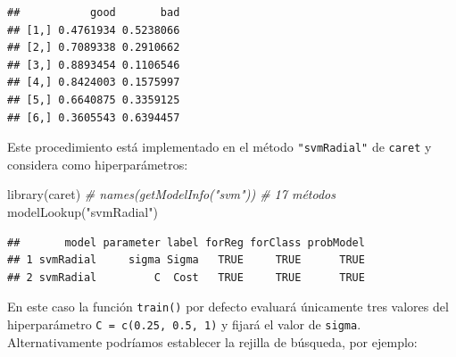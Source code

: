 \documentclass[
]{book}
\newenvironment{Shaded}{\begin{snugshade}}{\end{snugshade}}
\newcommand{\AttributeTok}[1]{\textcolor[rgb]{0.77,0.63,0.00}{#1}}
\newcommand{\CommentTok}[1]{\textcolor[rgb]{0.56,0.35,0.01}{\textit{#1}}}
\newcommand{\ConstantTok}[1]{\textcolor[rgb]{0.00,0.00,0.00}{#1}}
\newcommand{\DecValTok}[1]{\textcolor[rgb]{0.00,0.00,0.81}{#1}}
\newcommand{\FloatTok}[1]{\textcolor[rgb]{0.00,0.00,0.81}{#1}}
\newcommand{\FunctionTok}[1]{\textcolor[rgb]{0.00,0.00,0.00}{#1}}
\newcommand{\NormalTok}[1]{#1}
\newcommand{\OtherTok}[1]{\textcolor[rgb]{0.56,0.35,0.01}{#1}}
\newcommand{\SpecialCharTok}[1]{\textcolor[rgb]{0.00,0.00,0.00}{#1}}
\newcommand{\StringTok}[1]{\textcolor[rgb]{0.31,0.60,0.02}{#1}}
\theoremstyle{break}
\theoremstyle{definition}
\theoremstyle{definition}
\theoremstyle{definition}
\theoremstyle{definition}
\theoremstyle{remark}
\begin{document}
\begin{verbatim}
##           good       bad
## [1,] 0.4761934 0.5238066
## [2,] 0.7089338 0.2910662
## [3,] 0.8893454 0.1106546
## [4,] 0.8424003 0.1575997
## [5,] 0.6640875 0.3359125
## [6,] 0.3605543 0.6394457
\end{verbatim}

Este procedimiento está implementado en el método \texttt{"svmRadial"} de \texttt{caret} y considera como hiperparámetros:

\begin{Shaded}
\begin{Highlighting}[]
\FunctionTok{library}\NormalTok{(caret)}
\CommentTok{\# names(getModelInfo("svm")) \# 17 métodos}
\FunctionTok{modelLookup}\NormalTok{(}\StringTok{"svmRadial"}\NormalTok{)}
\end{Highlighting}
\end{Shaded}

\begin{verbatim}
##       model parameter label forReg forClass probModel
## 1 svmRadial     sigma Sigma   TRUE     TRUE      TRUE
## 2 svmRadial         C  Cost   TRUE     TRUE      TRUE
\end{verbatim}

En este caso la función \texttt{train()} por defecto evaluará únicamente tres valores del hiperparámetro \texttt{C\ =\ c(0.25,\ 0.5,\ 1)} y fijará el valor de \texttt{sigma}.
Alternativamente podríamos establecer la rejilla de búsqueda, por ejemplo:

\begin{Shaded}
\end{Shaded}
\end{document}
